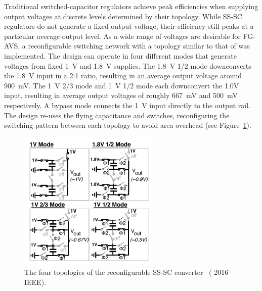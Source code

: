 \documentclass[graybox]{svmult}
\begin{document}

Traditional switched-capacitor regulators achieve peak efficiencies when supplying output voltages at discrete levels determined by their topology.
While SS-SC regulators do not generate a fixed output voltage, their efficiency still peaks at a particular average output level.
As a wide range of voltages are desirable for FG-AVS, a reconfigurable switching network with a topology similar to that of \cite{Le2011} was implemented.
The design can operate in four different modes that generate voltages from fixed \SI{1}{\volt} and \SI{1.8}{\volt} supplies.
The \SI{1.8}{\volt} 1/2 mode downconverts the \SI{1.8}{\volt} input in a 2:1 ratio, resulting in an average output voltage around \SI{900}{\milli\volt}.
The \SI{1}{\volt} 2/3 mode and \SI{1}{\volt} 1/2 mode each downconvert the 1.0V input, resulting in average output voltages of roughly \SI{667}{\milli\volt} and \SI{500}{\milli\volt} respectively.
A bypass mode connects the \SI{1}{\volt} input directly to the output rail.
The design re-uses the flying capacitance and switches, reconfiguring the switching pattern between each topology to avoid area overhead (see Figure~\ref{fig:3-dcdc-topologies}).

\begin{figure}
  \centering
  \includegraphics[width=0.6\textwidth]{3-dcdc-topologies}
  \caption{The four topologies of the reconfigurable SS-SC converter~\cite{Zimmer2016} ({\textcopyright} 2016 IEEE).}
  \label{fig:3-dcdc-topologies}
\end{figure}
\end{document}
